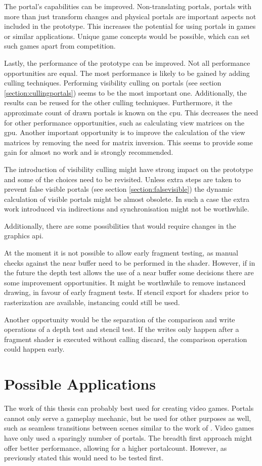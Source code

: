 The portal's capabilities can be improved. Non-translating portals, portals with more than just transform changes and physical portals are important aspects not included in the prototype. This increases the potential for using portals in games or similar applications. Unique game concepts would be possible, which can set such games apart from competition.

Lastly, the performance of the prototype can be improved. Not all performance opportunities are equal. The most performance is likely to be gained by adding culling techniques. Performing visibility culling on portals (see section \ref{section:cullingportals}) seems to be the most important one. Additionally, the results can be reused for the other culling techniques. Furthermore, it the approximate count of drawn portals is known on the \gls{cpu}. This decreases the need for other performance opportunities, such as calculating view matrices on the \gls{gpu}. Another important opportunity is to improve the calculation of the view matrices by removing the need for matrix inversion. This seems to provide some gain for almost no work and is strongly recommended.

The introduction of visibility culling might have strong impact on the prototype and some of the choices need to be revisited. Unless extra steps are taken to prevent false visible portals (see section \ref{section:falsevisible}) the dynamic calculation of visible portals might be almost obsolete. In such a case the extra work introduced via indirections and synchronisation might not be worthwhile.

Additionally, there are some possibilities that would require changes in the graphics \gls{api}.

At the moment it is not possible to allow early fragment testing, as manual checks against the near buffer need to be performed in the shader. However, if in the future the depth test allows the use of a near buffer some decisions there are some improvement opportunities. It might be worthwhile to remove instanced drawing, in favour of early fragment tests. If stencil export for shaders prior to rasterization are available, instancing could still be used.

Another opportunity would be the separation of the comparison and write operations of a depth test and stencil test. If the writes only happen after a fragment shader is executed without calling discard, the comparison operation could happen early.

\section{Possible Applications}
The work of this thesis can probably best used for creating video games. Portals cannot only serve a gameplay mechanic, but be used for other purposes as well, such as seamless transitions between scenes similar to the work of \textcite{schmalstieg:1999:sewing}. Video games have only used a sparingly number of portals. The breadth first approach might offer better performance, allowing for a higher \gls{portalcount}. However, as previously stated this would need to be tested first.

